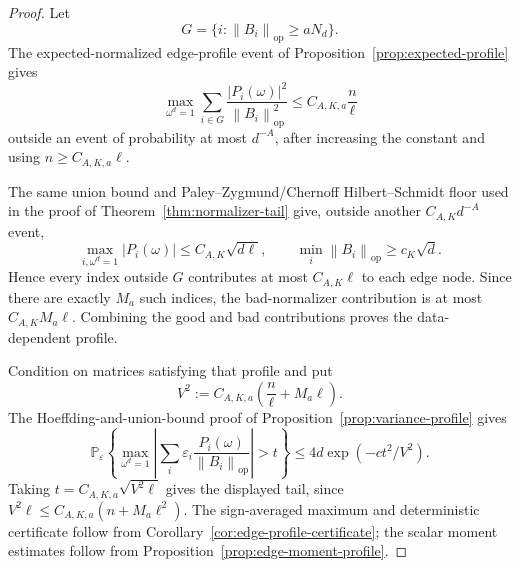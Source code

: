 \documentclass[11pt]{amsart}
\numberwithin{equation}{section}
\theoremstyle{definition}
\theoremstyle{remark}
\newcommand{\op}{\mathrm{op}}
\newcommand{\Prob}{\mathbb P}
\newcommand{\norm}[1]{\left\lVert #1\right\rVert}
\newcommand{\abs}[1]{\left\lvert #1\right\rvert}
\newcommand{\eps}{\varepsilon}
\begin{document}
\begin{proof}
Let
\[
  G=\{i:\norm{B_i}_{\op}\ge aN_d\}.
\]
The expected-normalized edge-profile event of
Proposition~\ref{prop:expected-profile} gives
\[
  \max_{\omega^d=1}\sum_{i\in G}
  \frac{\abs{P_i(\omega)}^2}{\norm{B_i}_{\op}^2}
  \le C_{A,K,a}\frac n\ell
\]
outside an event of probability at most \(d^{-A}\), after increasing the
constant and using \(n\ge C_{A,K,a}\ell\).

The same union bound and Paley--Zygmund/Chernoff Hilbert--Schmidt floor used in
the proof of Theorem~\ref{thm:normalizer-tail} give, outside another
\(C_{A,K}d^{-A}\) event,
\[
  \max_{i,\omega^d=1}\abs{P_i(\omega)}\le C_{A,K}\sqrt{d\ell},
  \qquad
  \min_i\norm{B_i}_{\op}\ge c_K\sqrt d .
\]
Hence every index outside \(G\) contributes at most \(C_{A,K}\ell\) to each
edge node.  Since there are exactly \(M_a\) such indices, the bad-normalizer
contribution is at most \(C_{A,K}M_a\ell\).  Combining the good and bad
contributions proves the data-dependent profile.

Condition on matrices satisfying that profile and put
\[
  V^2:=C_{A,K,a}\left(\frac n\ell+M_a\ell\right).
\]
The Hoeffding-and-union-bound proof of Proposition~\ref{prop:variance-profile}
gives
\[
  \Prob_\eps\left\{
  \max_{\omega^d=1}\left|\sum_i\eps_i
  \frac{P_i(\omega)}{\norm{B_i}_{\op}}\right|>t
  \right\}
  \le 4d\exp(-ct^2/V^2).
\]
Taking \(t=C_{A,K,a}\sqrt{V^2\ell}\) gives the displayed tail, since
\(V^2\ell\le C_{A,K,a}(n+M_a\ell^2)\).  The sign-averaged maximum and
deterministic certificate follow from
Corollary~\ref{cor:edge-profile-certificate}; the scalar moment estimates follow
from Proposition~\ref{prop:edge-moment-profile}.
\end{proof}
\end{document}
